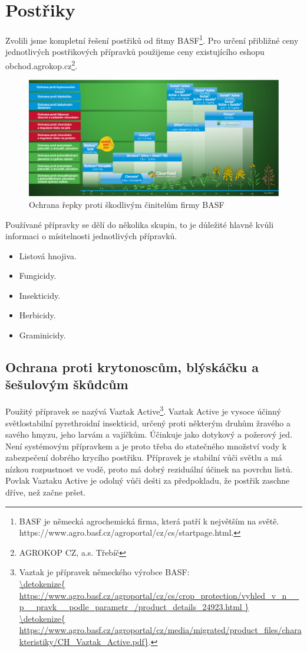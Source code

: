 
\section{Postřiky}
Zvolili jsme kompletní řešení postřiků od fitmy BASF\footnote{BASF je německá agrochemická firma, která patří k 
největším na světě.\\https://www.agro.basf.cz/agroportal/cz/cs/startpage.html.}.
Pro určení přibližné ceny jednotlivých postřikových přípravků použijeme ceny existujícího eshopu obchod.agrokop.cz\footnote{AGROKOP CZ, a.s. Třebíč}.
\begin{figure}[ht!]
\centering
\includegraphics[width=170mm]{img/basf_postriky.eps}
\caption{Ochrana řepky proti škodlivým činitelům firmy BASF \label{basf_postriky}}
\end{figure}
Používané přípravky se dělí do několika skupin, to je důležité hlavně kvůli informaci o mísitelnosti jednotlivých přípravků.
\begin{itemize}
  \item Listová hnojiva.
  \item Fungicidy.
  \item Insekticidy.
  \item Herbicidy.
  \item Graminicidy.
\end{itemize}

\subsection{Ochrana proti krytonoscům, blýskáčku a šešulovým škůdcům}
Použitý přípravek se nazývá Vaztak Active\footnote{Vaztak je přípravek německého výrobce BASF: \\\url{\detokenize{
https://www.agro.basf.cz/agroportal/cz/cs/crop_protection/vyhled_v_n__p__pravk__podle_parametr_/product_details_24923.html
}}
\\\url{\detokenize{
https://www.agro.basf.cz/agroportal/cz/media/migrated/product_files/charakteristiky/CH_Vaztak_Active.pdf}}.}.
Vaztak Active je vysoce účinný světlostabilní pyrethroidní insekticid, určený proti 
některým  druhům  žravého  a  savého  hmyzu,  jeho  larvám  a  vajíčkům.  Účinkuje  
jako dotykový a požerový jed. Není systémovým přípravkem a je proto třeba do statečného množství vody k zabezpečení dobrého krycího postřiku. Přípravek je 
stabilní vůči světlu a má nízkou rozpustnost ve vodě, proto má dobrý reziduální 
účinek na povrchu listů. Povlak Vaztaku Active je odolný vůči dešti za předpokladu, že postřik zaschne dříve, než začne pršet.

